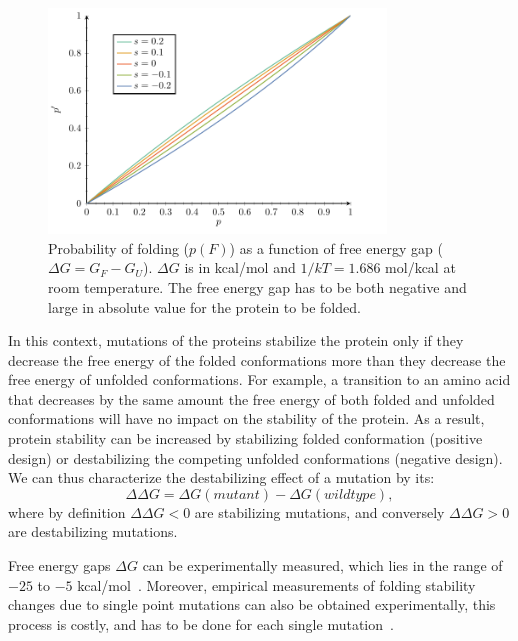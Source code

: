 \begin{figure}[H]
    \centering
    \includegraphics[width=0.8\textwidth, page=5] {figures.pdf}
    \caption[Probability of folding]{
    Probability of folding ($p(F)$) as a function of free energy gap ($\Delta G = G_F - G_U$).
    $\Delta G$ is in kcal/mol and $1/kT=1.686$ mol/kcal at room temperature.
    The free energy gap has to be both negative and large in absolute value for the protein to be folded.
    }
	\label{fig:intro-proba-folding}
\end{figure}

In this context, mutations of the proteins stabilize the protein only if they decrease the free energy of the folded conformations more than they decrease the free energy of unfolded conformations.
For example, a {transition} to an amino acid that decreases by the same amount the free energy of both folded and unfolded conformations will have no impact on the stability of the protein.
As a result, protein stability can be increased by stabilizing folded conformation (positive design) or destabilizing the competing unfolded conformations (negative design).
We can thus characterize the destabilizing effect of a mutation by its:
\begin{equation}
    \Delta \Delta G = \Delta G(mutant) - \Delta G(wild type),
\end{equation}
where by definition $\Delta \Delta G <0 $ are stabilizing mutations, and conversely $\Delta \Delta G > 0 $ are destabilizing mutations.

Free energy gaps $\Delta G$ can be experimentally measured, which lies in the range of $-25$ to $-5$ kcal/mol~\citep{Kumar2006, Gromiha2016}.
Moreover, empirical measurements of folding stability changes due to single point mutations can also be obtained experimentally, this process is costly, and has to be done for each single mutation~\citep{Rocklin2017}.

